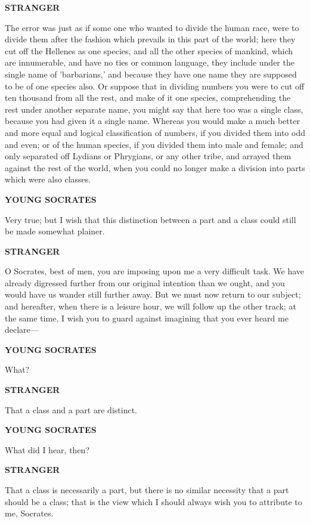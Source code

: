 \documentclass[11pt,letter]{article}
\begin{document}
\par \textbf{STRANGER}
\par   The error was just as if some one who wanted to divide the human race, were to divide them after the fashion which prevails in this part of the world; here they cut off the Hellenes as one species, and all the other species of mankind, which are innumerable, and have no ties or common language, they include under the single name of 'barbarians,' and because they have one name they are supposed to be of one species also. Or suppose that in dividing numbers you were to cut off ten thousand from all the rest, and make of it one species, comprehending the rest under another separate name, you might say that here too was a single class, because you had given it a single name. Whereas you would make a much better and more equal and logical classification of numbers, if you divided them into odd and even; or of the human species, if you divided them into male and female; and only separated off Lydians or Phrygians, or any other tribe, and arrayed them against the rest of the world, when you could no longer make a division into parts which were also classes.

\par \textbf{YOUNG SOCRATES}
\par   Very true; but I wish that this distinction between a part and a class could still be made somewhat plainer.

\par \textbf{STRANGER}
\par   O Socrates, best of men, you are imposing upon me a very difficult task. We have already digressed further from our original intention than we ought, and you would have us wander still further away. But we must now return to our subject; and hereafter, when there is a leisure hour, we will follow up the other track; at the same time, I wish you to guard against imagining that you ever heard me declare—

\par \textbf{YOUNG SOCRATES}
\par   What?

\par \textbf{STRANGER}
\par   That a class and a part are distinct.

\par \textbf{YOUNG SOCRATES}
\par   What did I hear, then?

\par \textbf{STRANGER}
\par   That a class is necessarily a part, but there is no similar necessity that a part should be a class; that is the view which I should always wish you to attribute to me, Socrates.
\end{document}
